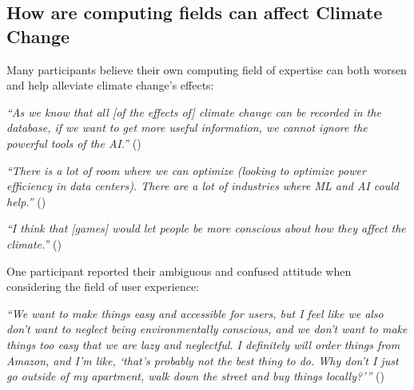     
\subsection{How are computing fields can affect Climate Change}

    
    
    Many participants believe their own computing field of expertise can both worsen and help alleviate climate change's effects: %
        
    
    \begin{quoting}
        \textit{
        ``As we know that all [of the effects of] climate change can be recorded in the database, if we want to get more useful information, we cannot ignore the powerful tools of the AI.''       }()
    \end{quoting}
    
    \begin{quoting}
        \textit{
        ``There is a lot of room where we can optimize (looking to optimize power efficiency in data centers). There are a lot of industries where ML and AI could help.''
        }  ()
    \end{quoting}
    
    \begin{quoting}
        \textit{
        ``I think that [games] would let people be more conscious about how they affect the climate.''
        }()
    \end{quoting}
    
    One participant reported their ambiguous and confused attitude when considering the field of user experience:
    
    \begin{quoting}
        \textit{
        ``We want to make things easy and accessible for users, but I feel like we also don't want to neglect being environmentally conscious, and we don't want to make things too easy that we are lazy and neglectful. I definitely will order things from Amazon, and I'm like, `that's probably not the best thing to do. Why don't I just go outside of my apartment, walk down the street and buy things locally?'\thinspace''  %
        }()
    \end{quoting}
    
